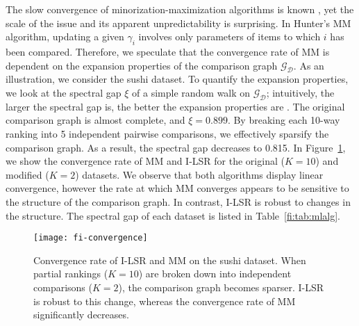 The slow convergence of minorization-maximization algorithms is known \citep{hunter2004mm}, yet the scale of the issue and its apparent unpredictability is surprising.
In Hunter's MM algorithm, updating a given $\gamma_i$ involves only parameters of items to which $i$ has been compared.
Therefore, we speculate that the convergence rate of MM is dependent on the expansion properties of the comparison graph $\mathcal{G}_{\mathcal{D}}$.
As an illustration, we consider the sushi dataset.
To quantify the expansion properties, we look at the spectral gap $\xi$ of a simple random walk on $\mathcal{G}_{\mathcal{D}}$;
intuitively, the larger the spectral gap is, the better the expansion properties are \citep{levin2008markov}.
The original comparison graph is almost complete, and $\xi = 0.899$.
By breaking each \num{10}-way ranking into \num{5} independent pairwise comparisons, we effectively sparsify the comparison graph.
As a result, the spectral gap decreases to \num{0.815}.
In Figure~\ref{fi:fig:convergence}, we show the convergence rate of MM and I-LSR for the original ($K = 10$) and modified ($K = 2$) datasets.
We observe that both algorithms display linear convergence, however the rate at which MM converges appears to be sensitive to the structure of the comparison graph.
In contrast, I-LSR is robust to changes in the structure.
The spectral gap of each dataset is listed in Table~\ref{fi:tab:mlalg}.


\begin{figure}
\centering
\texttt{[image: fi-convergence]}
\caption{
Convergence rate of I-LSR and MM on the sushi dataset.
When partial rankings ($K = 10$) are broken down into independent comparisons ($K = 2$), the comparison graph becomes sparser.
I-LSR is robust to this change, whereas the convergence rate of MM significantly decreases.
}
\label{fi:fig:convergence}
\end{figure}

